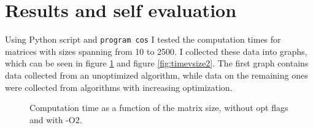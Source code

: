 \documentclass[a4paper]{article}
\begin{document}
\section*{Results and self evaluation}
Using Python script and \lstinline{program cos} I tested the computation times for matrices with sizes spanning from 10 to 250{}0.
I collected these data into graphs, which can be seen in figure \ref{fig:timevsize1} and figure \ref{fig:timevsize2}.
The first graph contains data collected from an unoptimized algorithm, while data on the remaining ones were collected from  algorithms with increasing optimization.
\begin{figure}[h]
\centering
{}
\caption{Computation time as a function of the matrix size, without opt flags and with -O2.}
\label{fig:timevsize1}
\end{figure}
\end{document}
